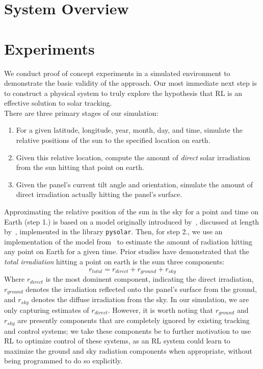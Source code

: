 \documentclass[11pt]{article}
\begin{document}
\section{System Overview}




\section{Experiments}

We conduct proof of concept experiments in a simulated environment to demonstrate the basic validity of the approach. Our most immediate next step is to construct a physical system to truly explore the hypothesis that RL is an effective solution to solar tracking. \\

There are three primary stages of our simulation:
\begin{enumerate}
\item For a given latitude, longitude, year, month, day, and time, simulate the relative positions of the sun to the specified location on earth.
\item Given this relative location, compute the amount of {\it direct} solar irradiation from the sun hitting that point on earth.
\item Given the panel's current tilt angle and orientation, simulate the amount of direct irradiation actually hitting the panel's surface.
\end{enumerate}

Approximating the relative position of the sun in the sky for a point and time on Earth (step 1.) is based on a model originally introduced by~\citet{jordan1958chafer}, discussed at length by~\citet{masters2013renewable}, implemented in the library \texttt{pysolar}. Then, for step 2., we use an implementation of the model from~\citet{masters2013renewable} to estimate the amount of radiation hitting any point on Earth for a given time. Prior studies have demonstrated that the {\it total irradiation} hitting a point on earth is the sum three components:
\begin{equation}
r_{total} = r_{direct} + r_{ground} + r_{sky}
\end{equation}
Where $r_{direct}$ is the most dominent component, indicating the direct irradiation, $r_{ground}$ denotes the irradiation reflected onto the panel's surface from the ground, and $r_{sky}$ denotes the diffuse irradiation from the sky. In our simulation, we are only capturing estimates of $r_{direct}$. However, it is worth noting that $r_{ground}$ and $r_{sky}$ are presently components that are completely ignored by existing tracking and control systems; we take these components be to further motivation to use RL to optimize control of these systems, as an RL system could learn to maximize the ground and sky radiation components when appropriate, without being programmed to do so explicitly.
\end{document}
